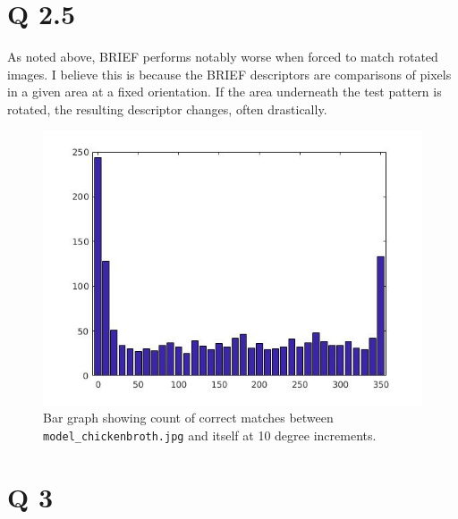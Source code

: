 \documentclass[11pt]{article}
\begin{document}
\section*{Q 2.5}
As noted above, BRIEF performs notably worse when forced to match rotated images. I believe this is 
because the BRIEF descriptors are comparisons of pixels in a given area at a fixed orientation. If 
the area underneath the test pattern is rotated, the resulting descriptor changes, often drastically. 

\begin{figure}[H]
\centering
\includegraphics[width=.7\textwidth]{results/brief_rot_test.jpg}
\caption{Bar graph showing count of correct matches between \texttt{model\_chickenbroth.jpg} 
and itself at 10 degree increments.}
\end{figure}
\section*{Q 3}
\end{document}
